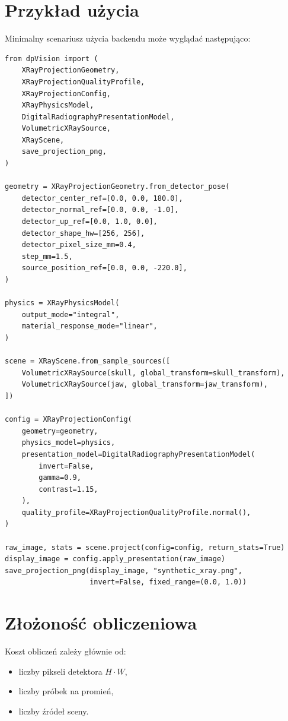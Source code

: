 \documentclass[12pt,a4paper]{article}
\begin{document}
\section{Przykład użycia}

Minimalny scenariusz użycia backendu może wyglądać następująco:

\begin{lstlisting}[style=python, caption={Minimalny przykład użycia sceny RTG}]
from dpVision import (
    XRayProjectionGeometry,
    XRayProjectionQualityProfile,
    XRayProjectionConfig,
    XRayPhysicsModel,
    DigitalRadiographyPresentationModel,
    VolumetricXRaySource,
    XRayScene,
    save_projection_png,
)

geometry = XRayProjectionGeometry.from_detector_pose(
    detector_center_ref=[0.0, 0.0, 180.0],
    detector_normal_ref=[0.0, 0.0, -1.0],
    detector_up_ref=[0.0, 1.0, 0.0],
    detector_shape_hw=[256, 256],
    detector_pixel_size_mm=0.4,
    step_mm=1.5,
    source_position_ref=[0.0, 0.0, -220.0],
)

physics = XRayPhysicsModel(
    output_mode="integral",
    material_response_mode="linear",
)

scene = XRayScene.from_sample_sources([
    VolumetricXRaySource(skull, global_transform=skull_transform),
    VolumetricXRaySource(jaw, global_transform=jaw_transform),
])

config = XRayProjectionConfig(
    geometry=geometry,
    physics_model=physics,
    presentation_model=DigitalRadiographyPresentationModel(
        invert=False,
        gamma=0.9,
        contrast=1.15,
    ),
    quality_profile=XRayProjectionQualityProfile.normal(),
)

raw_image, stats = scene.project(config=config, return_stats=True)
display_image = config.apply_presentation(raw_image)
save_projection_png(display_image, "synthetic_xray.png",
                    invert=False, fixed_range=(0.0, 1.0))
\end{lstlisting}

\section{Złożoność obliczeniowa}

Koszt obliczeń zależy głównie od:
\begin{itemize}
  \item liczby pikseli detektora \(H\cdot W\),
  \item liczby próbek na promień,
  \item liczby źródeł sceny.
\end{itemize}
\end{document}
